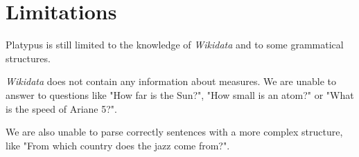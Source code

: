 \section{Limitations}

Platypus is still limited to the knowledge of \emph{Wikidata} and to some grammatical
structures.

\emph{Wikidata} does not contain any information about measures. We are unable
to answer to questions like "How far is the Sun?", "How small is an atom?" or
"What is the speed of Ariane 5?".

We are also unable to parse correctly sentences with a more complex structure, like
"From which country does the jazz come from?".
